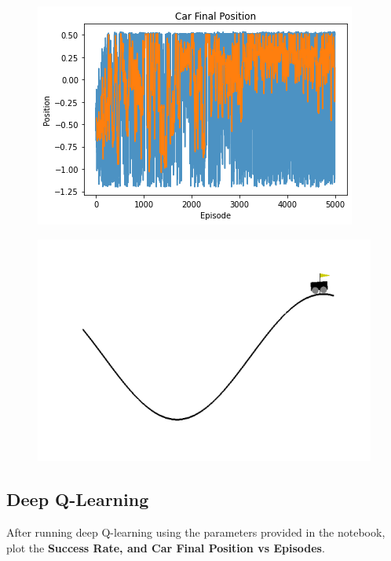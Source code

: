  \begin{figure}[H]
   \centering
     \includegraphics[scale=0.7]
     {templates/position1}
 \end{figure}

 \begin{figure}[H]
   \centering
     \includegraphics[scale=0.7]
     {templates/car1}
 \end{figure}

\subsection{Deep Q-Learning}

After running deep Q-learning using the parameters provided in the notebook, plot the \textbf{Success Rate, and Car Final Position vs Episodes}.

